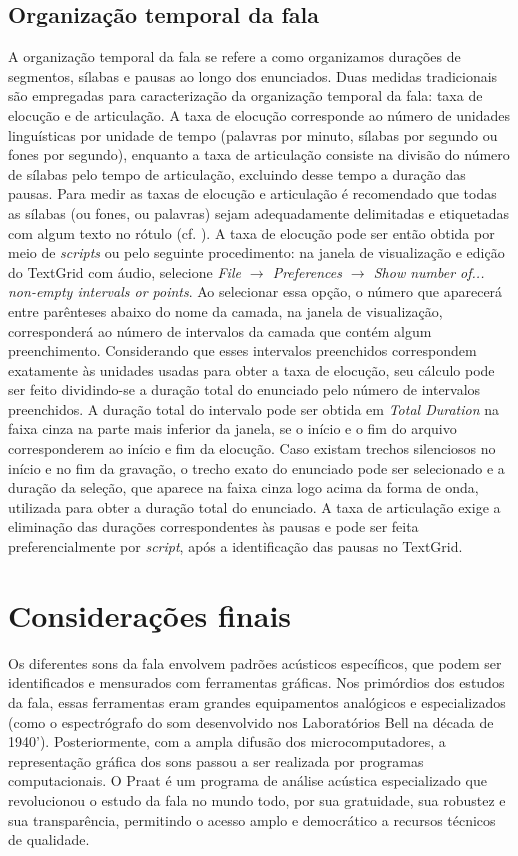 \documentclass[portuguese]{textolivre}
\begin{document}
\subsection{Organização temporal da fala}\label{sec-organizacao}
A organização temporal da fala se refere a como organizamos durações de segmentos, sílabas e pausas ao longo dos enunciados. Duas medidas tradicionais são empregadas para caracterização da organização temporal da fala: taxa de elocução e de articulação. A taxa de elocução corresponde ao número de unidades linguísticas por unidade de tempo (palavras por minuto, sílabas por segundo ou fones por segundo), enquanto a taxa de articulação consiste na divisão do número de sílabas pelo tempo de articulação, excluindo desse tempo a duração das pausas. Para medir as taxas de elocução e articulação é recomendado que todas as sílabas (ou fones, ou palavras) sejam adequadamente delimitadas e etiquetadas com algum texto no rótulo (cf. ). A taxa de elocução pode ser então obtida por meio de \textit{scripts} ou pelo seguinte procedimento: na janela de visualização e edição do TextGrid com áudio, selecione \textit{File $\rightarrow$ Preferences $\rightarrow$ Show number of... non-empty intervals or points}. Ao selecionar essa opção, o número que aparecerá entre parênteses abaixo do nome da camada, na janela de visualização, corresponderá ao número de intervalos da camada que contém algum preenchimento. Considerando que esses intervalos preenchidos correspondem exatamente às unidades usadas para obter a taxa de elocução, seu cálculo pode ser feito dividindo-se a duração total do enunciado pelo número de intervalos preenchidos. A duração total do intervalo pode ser obtida em \textit{Total Duration} na faixa cinza na parte mais inferior da janela, se o início e o fim do arquivo corresponderem ao início e fim da elocução. Caso existam trechos silenciosos no início e no fim da gravação, o trecho exato do enunciado pode ser selecionado e a duração da seleção, que aparece na faixa cinza logo acima da forma de onda, utilizada para obter a duração total do enunciado. A taxa de articulação exige a eliminação das durações correspondentes às pausas e pode ser feita preferencialmente por \textit{script}, após a identificação das pausas no TextGrid.

\section{Considerações finais}\label{sec-consideracoes}
Os diferentes sons da fala envolvem padrões acústicos específicos, que podem ser identificados e mensurados com ferramentas gráficas. Nos primórdios dos estudos da fala, essas ferramentas eram grandes equipamentos analógicos e especializados (como o espectrógrafo do som desenvolvido nos Laboratórios Bell na década de 1940'). Posteriormente, com a ampla difusão dos microcomputadores, a representação gráfica dos sons passou a ser realizada por programas computacionais. O Praat é um programa de análise acústica especializado que revolucionou o estudo da fala no mundo todo, por sua gratuidade, sua robustez e sua transparência, permitindo o acesso amplo e democrático a recursos técnicos de qualidade.   
\end{document}
